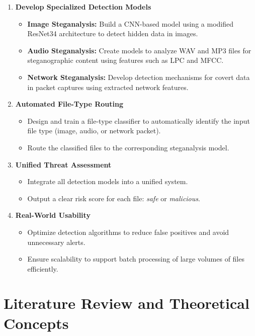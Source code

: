 \documentclass[12pt]{article}
\begin{document}
\begin{enumerate}
    \item \textbf{Develop Specialized Detection Models}
    \begin{itemize}
        \item \textbf{Image Steganalysis:} Build a CNN-based model using a modified ResNet34 architecture to detect hidden data in images.
        \item \textbf{Audio Steganalysis:} Create models to analyze WAV and MP3 files for steganographic content using features such as LPC and MFCC.
        \item \textbf{Network Steganalysis:} Develop detection mechanisms for covert data in packet captures using extracted network features.
    \end{itemize}

    \item \textbf{Automated File-Type Routing}
    \begin{itemize}
        \item Design and train a file-type classifier to automatically identify the input file type (image, audio, or network packet).
        \item Route the classified files to the corresponding steganalysis model.
    \end{itemize}

    \item \textbf{Unified Threat Assessment}
    \begin{itemize}
        \item Integrate all detection models into a unified system.
        \item Output a clear risk score for each file: \textit{safe} or \textit{malicious}.
    \end{itemize}

    \item \textbf{Real-World Usability}
    \begin{itemize}
        \item Optimize detection algorithms to reduce false positives and avoid unnecessary alerts.
        \item Ensure scalability to support batch processing of large volumes of files efficiently.
    \end{itemize}
\end{enumerate}

\section{Literature Review and Theoretical Concepts}
\end{document}
